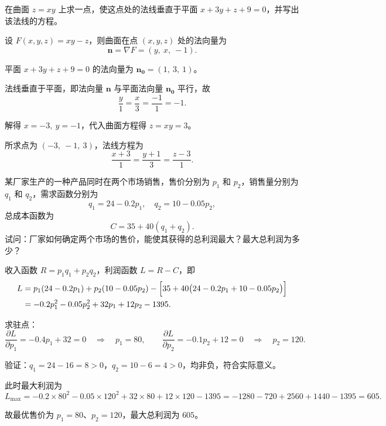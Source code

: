 \documentclass[answer]{THUExam}
\begin{document}
\begin{problem}
在曲面 $z=xy$ 上求一点，使这点处的法线垂直于平面 $x+3y+z+9=0$，并写出该法线的方程。
\end{problem}
\begin{solution}
设 $F(x,y,z)=xy-z$，则曲面在点 $(x,y,z)$ 处的法向量为
\[
\boldsymbol{n}=\nabla F=(y,\ x,\ -1).
\]

平面 $x+3y+z+9=0$ 的法向量为 $\boldsymbol{n_0}=(1,\ 3,\ 1)$。

法线垂直于平面，即法向量 $\boldsymbol{n}$ 与平面法向量 $\boldsymbol{n_0}$ 平行，故
\[
\frac{y}{1}=\frac{x}{3}=\frac{-1}{1}=-1.
\]

解得 $x=-3,\ y=-1$，代入曲面方程得 $z=xy=3$。

所求点为 $\boxed{(-3,\ -1,\ 3)}$，法线方程为
\[
\boxed{\frac{x+3}{1}=\frac{y+1}{3}=\frac{z-3}{1}}.
\]
\end{solution}

\newpage
{}

\begin{problem}
某厂家生产的一种产品同时在两个市场销售，售价分别为 $p_1$ 和 $p_2$，销售量分别为 $q_1$ 和 $q_2$，需求函数分别为
\[
q_1=24-0.2p_1,\quad q_2=10-0.05p_2,
\]
总成本函数为
\[
C=35+40\left(q_1+q_2\right).
\]
试问：厂家如何确定两个市场的售价，能使其获得的总利润最大？最大总利润为多少？
\end{problem}
\begin{solution}
收入函数 $R=p_1q_1+p_2q_2$，利润函数 $L=R-C$，即
\begin{align*}
L&=p_1(24-0.2p_1)+p_2(10-0.05p_2)-\Bigl[35+40\bigl(24-0.2p_1+10-0.05p_2\bigr)\Bigr]\\
&=-0.2p_1^2-0.05p_2^2+32p_1+12p_2-1395.
\end{align*}

求驻点：
\[
\frac{\partial L}{\partial p_1}=-0.4p_1+32=0\quad\Longrightarrow\quad p_1=80,\qquad
\frac{\partial L}{\partial p_2}=-0.1p_2+12=0\quad\Longrightarrow\quad p_2=120.
\]

验证：$q_1=24-16=8>0$，$q_2=10-6=4>0$，均非负，符合实际意义。

此时最大利润为
\[
L_{\max}=-0.2\times 80^2-0.05\times 120^2+32\times 80+12\times 120-1395
=-1280-720+2560+1440-1395=\boxed{605}.
\]

故最优售价为 $\boxed{p_1=80}$、$\boxed{p_2=120}$，最大总利润为 $\boxed{605}$。
\end{solution}
\vspace{0.5cm}
\end{document}
